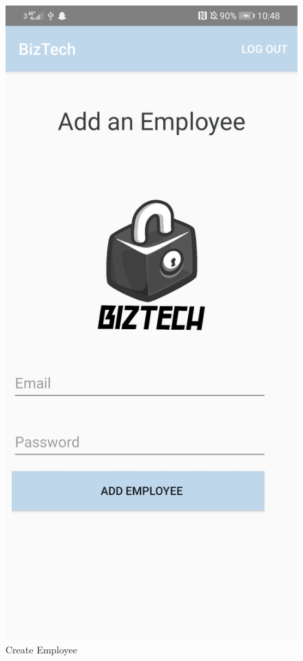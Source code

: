 \begin{figure}[!htb]
    \centering
    \includegraphics[scale=0.15]{img/AddNewEmployeePage.jpg}
    \caption{Create Employee}
    \label{fig}
\end{figure}

